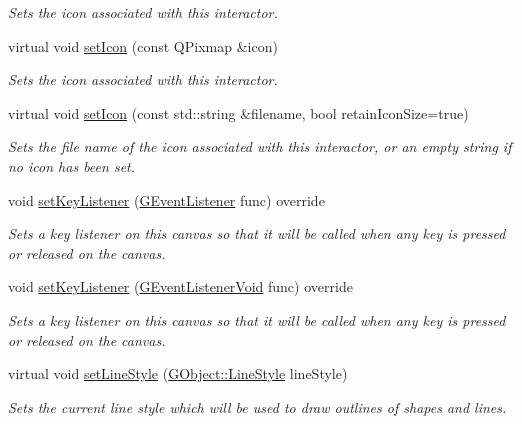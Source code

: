 \begin{DoxyCompactItemize}
\begin{DoxyCompactList}\small\item\em Sets the icon associated with this interactor. \end{DoxyCompactList}\item 
virtual void \mbox{\hyperlink{classsgl_1_1GInteractor_a368e1a338f84401c284506d03b1ba769}{set\+Icon}} (const Q\+Pixmap \&icon)
\begin{DoxyCompactList}\small\item\em Sets the icon associated with this interactor. \end{DoxyCompactList}\item 
virtual void \mbox{\hyperlink{classsgl_1_1GInteractor_a762e139aa311461c3984d3ad28293f64}{set\+Icon}} (const std\+::string \&filename, bool retain\+Icon\+Size=true)
\begin{DoxyCompactList}\small\item\em Sets the file name of the icon associated with this interactor, or an empty string if no icon has been set. \end{DoxyCompactList}\item 
void \mbox{\hyperlink{classsgl_1_1GCanvas_a53809ec015da5bf9fad5e7a11b218993}{set\+Key\+Listener}} (\mbox{\hyperlink{namespacesgl_ae9f3e9eab70035da1a2b114e21357b25}{G\+Event\+Listener}} func) override
\begin{DoxyCompactList}\small\item\em Sets a key listener on this canvas so that it will be called when any key is pressed or released on the canvas. \end{DoxyCompactList}\item 
void \mbox{\hyperlink{classsgl_1_1GCanvas_a1320ed9889a730dfead04a334463ecf3}{set\+Key\+Listener}} (\mbox{\hyperlink{namespacesgl_a54427ce97bb1c2804e4fe2b0a62e8b17}{G\+Event\+Listener\+Void}} func) override
\begin{DoxyCompactList}\small\item\em Sets a key listener on this canvas so that it will be called when any key is pressed or released on the canvas. \end{DoxyCompactList}\item 
virtual void \mbox{\hyperlink{classsgl_1_1GDrawingSurface_a6bfe14a77101db0fb97b5a7e07a5526b}{set\+Line\+Style}} (\mbox{\hyperlink{classsgl_1_1GObject_a86e0f5648542856159bb40775c854aa7}{G\+Object\+::\+Line\+Style}} line\+Style)
\begin{DoxyCompactList}\small\item\em Sets the current line style which will be used to draw outlines of shapes and lines. \end{DoxyCompactList}\item 

\end{DoxyCompactItemize}

